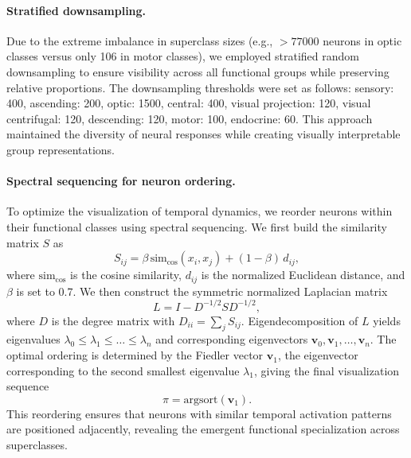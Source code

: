 \documentclass[a4paper]{easychair}
\begin{document}
\paragraph{Stratified downsampling.}
Due to the extreme imbalance in superclass sizes (e.g., $>77000$ neurons in optic classes versus only 106 in motor classes), we employed stratified random downsampling to ensure visibility across all functional groups while preserving relative proportions. The downsampling thresholds were set as follows: sensory: 400, ascending: 200, optic: 1500, central: 400, visual projection: 120, visual centrifugal: 120, descending: 120, motor: 100, endocrine: 60. This approach maintained the diversity of neural responses while creating visually interpretable group representations.

\paragraph{Spectral sequencing for neuron ordering.}
To optimize the visualization of temporal dynamics, we reorder neurons within their functional classes using spectral sequencing. We first build the similarity matrix $S$ as
\begin{equation}
S_{ij} = \beta \, \text{sim}_{\text{cos}}(x_i, x_j) + (1 - \beta)\, d_{ij},
\end{equation}
where $\text{sim}_{\text{cos}}$ is the cosine similarity, $d_{ij}$ is the normalized Euclidean distance, and $\beta$ is set to 0.7. We then construct the symmetric normalized Laplacian matrix
\begin{equation}
L = I - D^{-1/2} S D^{-1/2},
\end{equation}
where $D$ is the degree matrix with $D_{ii} = \sum_j S_{ij}$. Eigendecomposition of $L$ yields eigenvalues $\lambda_0 \le \lambda_1 \le \dots \le \lambda_n$ and corresponding eigenvectors $\mathbf{v}_0, \mathbf{v}_1, \dots, \mathbf{v}_n$. The optimal ordering is determined by the Fiedler vector $\mathbf{v}_1$, the eigenvector corresponding to the second smallest eigenvalue $\lambda_1$, giving the final visualization sequence
\begin{equation}
\pi = \text{argsort}(\mathbf{v}_1).
\end{equation}
This reordering ensures that neurons with similar temporal activation patterns are positioned adjacently, revealing the emergent functional specialization across superclasses.
\end{document}
